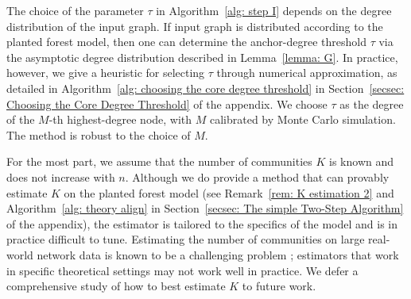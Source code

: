 \documentclass[twoside,11pt]{article}
\theoremstyle{remark}
\begin{document}




\begin{remark}
\label{rem:anchor-degree-threshold}
The choice of the parameter $\tau$ in Algorithm~\ref{alg: step I} depends on the degree distribution of the input graph. 
If input graph is distributed according to the planted forest model, then one can determine the anchor-degree threshold $\tau$ via the asymptotic degree distribution described in Lemma~\ref{lemma: G}. In practice, however, we give a heuristic for selecting $\tau$ through numerical approximation, as detailed in Algorithm~\ref{alg: choosing the core degree threshold} in Section~\ref{secsec: Choosing the Core Degree Threshold} of the appendix. We choose $\tau$ as the degree of the $M$-th highest-degree node, with $M$ calibrated by Monte Carlo simulation. The method is robust to the choice of $M$.
\end{remark}


\begin{remark}
\label{rem: K estimation 1}
For the most part, we assume that the number of communities $K$ is known and does not increase with $n$. Although we do provide a method that can provably estimate $K$ on the planted forest model (see Remark~\ref{rem: K estimation 2} and  Algorithm~\ref{alg: theory align} in Section~\ref{secsec: The simple Two-Step Algorithm} of the appendix), the estimator is tailored to the specifics of the model and is in practice difficult to tune. Estimating the number of communities on large real-world network data is known to be a challenging problem \citep{le2022estimating,ma2021determining,jin2023optimal,wang2017likelihood}; estimators that work in specific theoretical settings may not work well in practice. We defer a comprehensive study of how to best estimate $K$ to future work. 
\end{remark}
\end{document}
